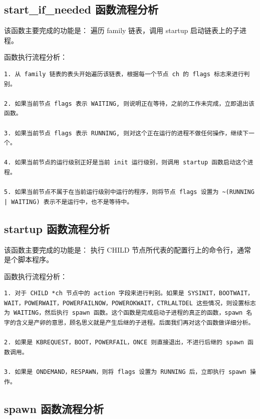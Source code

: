 \subsection{start\_if\_needed 函数流程分析}

该函数主要完成的功能是： 遍历 family 链表，调用 startup
启动链表上的子进程。

函数执行流程分析：

{\begin{shaded}\begin{verbatim}
1. 从 family 链表的表头开始遍历该链表，根据每一个节点 ch 的 flags 标志来进行判别。

2. 如果当前节点 flags 表示 WAITING, 则说明正在等待，之前的工作未完成，立即退出该函数。

3. 如果当前节点 flags 表示 RUNNING, 则对这个正在运行的进程不做任何操作，继续下一个。

4. 如果当前节点的运行级别正好是当前 init 运行级别，则调用 startup 函数启动这个进程。

5. 如果当前节点不属于在当前运行级别中运行的程序，则将节点 flags 设置为 ~(RUNNING | WAITING) 表示不是运行中，也不是等待中。
\end{verbatim}\end{shaded}}
\subsection{startup 函数流程分析}

该函数主要完成的功能是： 执行 CHILD
节点所代表的配置行上的命令行，通常是个脚本程序。

函数执行流程分析：

{\begin{shaded}\begin{verbatim}
1. 对于 CHILD *ch 节点中的 action 字段来进行判别。如果是 SYSINIT，BOOTWAIT，WAIT，POWERWAIT，POWERFAILNOW，POWEROKWAIT，CTRLALTDEL 这些情况，则设置标志为 WAITING，然后执行 spawn 函数。这个函数是完成启动子进程的真正的函数，spawn 名字的含义是产卵的意思，顾名思义就是产生后继的子进程。后面我们再对这个函数做详细分析。

2. 如果是 KBREQUEST，BOOT，POWERFAIL，ONCE 则直接退出，不进行后继的 spawn 函数调用。

3. 如果是 ONDEMAND，RESPAWN，则将 flags 设置为 RUNNING 后，立即执行 spawn 操作。
\end{verbatim}\end{shaded}}
\subsection{spawn 函数流程分析}

